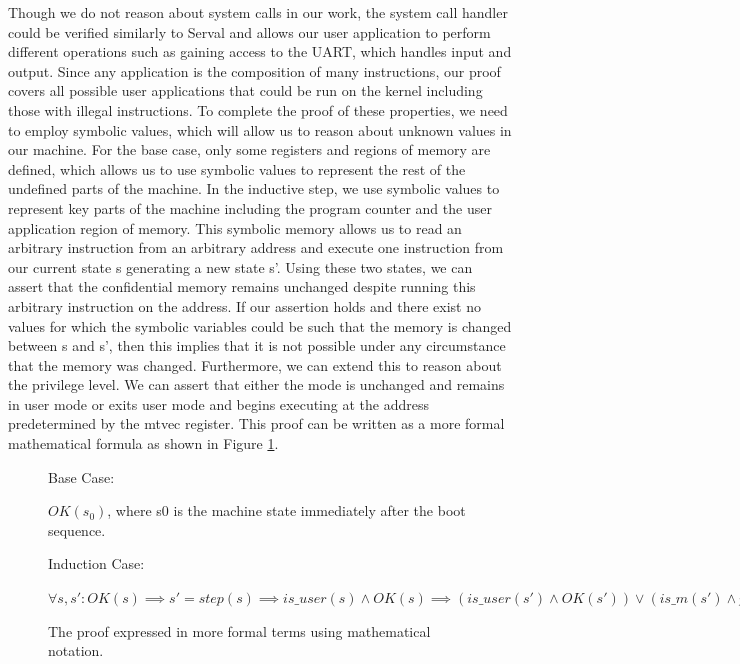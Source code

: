 \documentclass[]{article}
\begin{document}
Though we do not reason about system calls in our work, the system call handler could be verified similarly to Serval and allows our user application to perform different operations such as gaining access to the UART, which handles input and output. Since any application is the composition of many instructions, our proof covers all possible user applications that could be run on the kernel including those with illegal instructions. To complete the proof of these properties, we need to employ symbolic values, which will allow us to reason about unknown values in our machine. For the base case, only some registers and regions of memory are defined, which allows us to use symbolic values to represent the rest of the undefined parts of the machine. In the inductive step, we use symbolic values to represent key parts of the machine including the program counter and the user application region of memory. This symbolic memory allows us to read an arbitrary instruction from an arbitrary address and execute one instruction from our current state s generating a new state s'. Using these two states, we can assert that the confidential memory remains unchanged despite running this arbitrary instruction on the address. If our assertion holds and there exist no values for which the symbolic variables could be such that the memory is changed between s and s', then this implies that it is not possible under any circumstance that the memory was changed. Furthermore, we can extend this to reason about the privilege level. We can assert that either the mode is unchanged and remains in user mode or exits user mode and begins executing at the address predetermined by the mtvec register. This proof can be written as a more formal mathematical formula as shown in Figure \ref{fig:figure4}.

\begin{figure}
Base Case:
\vspace{5pt}

$OK(s_0)$, where s0 is the machine state immediately after the boot
sequence.

\vspace{15pt}

Induction Case:
\vspace{5pt}

$\forall s, s' : OK(s) \implies s' = step(s) \implies is\_user(s) \land OK(s) \implies (is\_user(s') \land OK(s')) \lor (is\_m(s') \land pc(s') = mtvec(s))$

\caption{The proof expressed in more formal terms using mathematical notation.}
\label{fig:figure4}
\end{figure}
\end{document}
